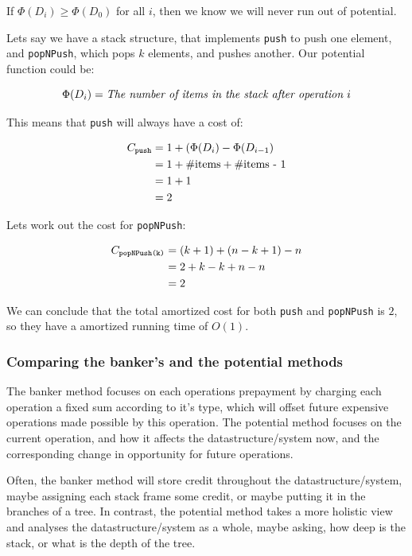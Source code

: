 If $\Phi(D_i) \geq \Phi(D_0)$ for all $i$, then we know we will never run out of
potential.

Lets say we have a stack structure, that implements \texttt{push} to push one
element, and \texttt{popNPush}, which pops $k$ elements, and pushes another. Our
potential function could be: 

\[
  \Phi(D_i) = \text{\textit{The number of items in the stack after operation $i$}}
\]

This means that \texttt{push} will always have a cost of:

\begin{align*}
  C_{\text{\texttt{push}}} &= 1 + \left(\Phi(D_i) - \Phi(D_{i-1}\right)\\
                           &= 1 + \text{\#items} + \text{\#items - 1}\\
                           &= 1 + 1\\
                           &= 2
\end{align*}

Lets work out the cost for \texttt{popNPush}:

\begin{align*}
  C_{\text{\texttt{popNPush(k)}}} &= (k + 1) + (n - k + 1) - n\\
                                  &= 2 + k - k + n - n\\
                                  &= 2
\end{align*}

We can conclude that the total amortized cost for both \texttt{push} and
\texttt{popNPush} is $2$, so they have a amortized running time of $O(1)$.

\subsubsection{Comparing the banker's and the potential methods}

The banker method focuses on each operations prepayment by charging each
operation a fixed sum according to it's type, which will offset future expensive
operations made possible by this operation. The potential method focuses on the
current operation, and how it affects the datastructure/system now, and the
corresponding change in opportunity for future operations.

Often, the banker method will store credit throughout the datastructure/system,
maybe assigning each stack frame some credit, or maybe putting it in the
branches of a tree. In contrast, the potential method takes a more holistic view
and analyses the datastructure/system as a whole, maybe asking, how deep is the
stack, or what is the depth of the tree.

